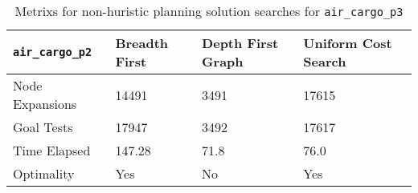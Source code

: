 \documentclass{article}
\begin{document}
\begin{table}[h]
\begin{center}
\begin{tabular}{|l|l|l|l|}
\hline
{\tt air\_cargo\_p2} & Breadth First & Depth First Graph& Uniform Cost Search \\ \hline\hline
Node Expansions& 14491  &  3491& 17615 \\ 
Goal Tests & 17947& 3492  & 17617 \\ 
Time Elapsed& 147.28 &71.8  & 76.0 \\ 
Optimality & Yes & No & Yes\\ \hline
\end{tabular}
\end{center}
\caption{Metrixs for non-huristic planning solution searches for {\tt air\_cargo\_p3}}
\end{table}


{}

\end{document}
